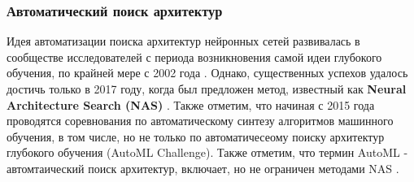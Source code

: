 \documentclass[12pt]{article}
\begin{document}
\begin{sloppypar}
\subsubsection{Автоматический поиск архитектур}
Идея автоматизации поиска архитектур нейронных сетей развивалась в сообществе исследователей с периода возникновения самой идеи глубокого обучения, по крайней мере с 2002 года \cite{Lilian2020NAS}. Однако, существенных успехов удалось достичь только в 2017 году, когда был предложен метод, известный как \textbf{Neural Architecture Search (NAS)} \cite{elsken2019neural}. Также отметим, что начиная с  2015 года проводятся соревнования по автоматическому синтезу алгоритмов машинного обучения, в том числе, но не только по автоматичесеому поиску архитектур глубокого обучения (AutoML Challenge). Также отметим, что термин AutoML - автомтаический поиск архитектур, включает, но не ограничен методами NAS \cite{hutter2019automated}.


\end{sloppypar}
\end{document}
